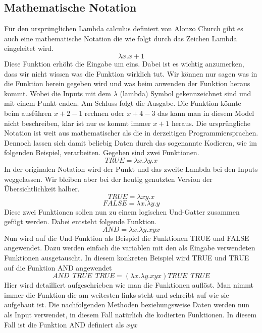 \subsection{Mathematische Notation}
Für den ursprünglichen Lambda calculus definiert von Alonzo Church gibt es auch eine mathematische Notation die wie folgt durch das Zeichen Lambda eingeleitet wird.
\begin{equation}
\lambda x. x + 1
\end{equation}
Diese Funktion erhöht die Eingabe um eins. Dabei ist es wichtig anzumerken, dass wir nicht wissen was die Funktion wirklich tut. Wir können nur sagen was in die Funktion herein gegeben wird und was beim anwenden der Funktion heraus kommt. Wobei die Inputs mit dem $\lambda$ (lambda) Symbol gekennzeichnet sind und mit einem Punkt enden. Am Schluss folgt die Ausgabe. Die Funktion könnte beim ausführen $x + 2 - 1$ rechnen oder $x + 4 - 3$ das kann man in diesem Model nicht beschreiben, klar ist nur es kommt immer $x + 1$ heraus.
Die ursprüngliche Notation ist weit aus mathematischer als die in derzeitigen Programmiersprachen. Dennoch lassen sich damit beliebig Daten durch das sogenannte Kodieren, wie im folgenden Beispiel, verarbeiten. Gegeben sind zwei Funktionen.
\begin{equation}
TRUE = \lambda x. \lambda y. x
\end{equation}
In der originalen Notation wird der Punkt und das zweite Lambda bei den Inputs weggelassen. Wir bleiben aber bei der heutig genutzten Version der Übersichtlichkeit halber. \cite{churchcalculi}
\begin{equation}
TRUE = \lambda xy. x
\end{equation}
\begin{equation}
FALSE = \lambda x. \lambda y. y
\end{equation}
Diese zwei Funktionen sollen nun zu einem logischen Und-Gatter zusammen gefügt werden. Dabei entsteht folgende Funktion.
\begin{equation}
AND = \lambda x. \lambda y. x y x
\end{equation}
Nun wird auf die Und-Funktion als Beispiel die Funktionen TRUE und FALSE angewendet. Dazu werden einfach die variablen mit den als Eingabe verwendeten Funktionen ausgetauscht. In diesem konkreten Beispiel wird TRUE und TRUE auf die Funktion AND angewendet
\begin{equation}
AND\:\:TRUE\:\:TRUE = (\lambda x. \lambda y. x y x) TRUE\:\:TRUE 
\end{equation}
Hier wird detailliert aufgeschrieben wie man die Funktionen auflöst. Man nimmt immer die Funktion die am weitesten links steht und schreibt auf wie sie aufgebaut ist. Die nachfolgenden Methoden beziehungsweise Daten werden nun als Input verwendet, in diesem Fall natürlich die kodierten Funktionen. In diesem Fall ist die Funktion AND definiert als $x y x$
